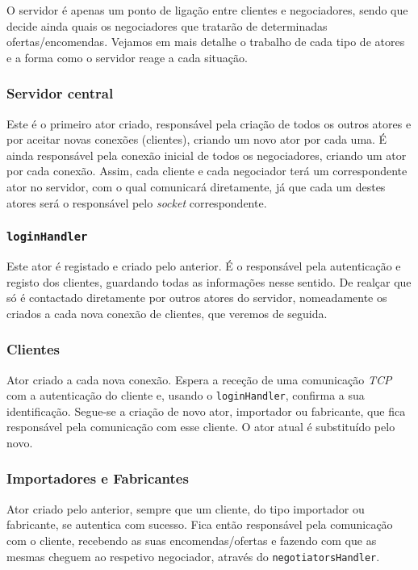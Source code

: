 \documentclass[a4paper]{report}
\begin{document}
	O servidor é apenas um ponto de ligação entre clientes e negociadores, sendo que decide ainda quais os negociadores que tratarão de determinadas ofertas/encomendas.
	Vejamos em mais detalhe o trabalho de cada tipo de atores e a forma como o servidor reage a cada situação.

	\subsubsection{Servidor central}
	Este é o primeiro ator criado, responsável pela criação de todos os outros atores e por aceitar novas conexões (clientes), criando um novo ator por cada uma. 
	É ainda responsável pela conexão inicial de todos os negociadores, criando um ator por cada conexão.
	Assim, cada cliente e cada negociador terá um correspondente ator no servidor, com o qual comunicará diretamente, já que cada um destes atores será o responsável pelo \textit{socket} correspondente.

	\subsubsection{\texttt{loginHandler}}
	Este ator é registado e criado pelo anterior. É o responsável pela autenticação e registo dos clientes, guardando todas as informações nesse sentido. 
	De realçar que só é contactado diretamente por outros atores do servidor, nomeadamente os criados a cada nova conexão de clientes, que veremos de seguida.

	\subsubsection{Clientes}
	Ator criado a cada nova conexão. Espera a receção de uma comunicação \textit{TCP} com a autenticação do cliente e, usando o \texttt{loginHandler}, confirma a sua identificação.
	Segue-se a criação de novo ator, importador ou fabricante, que fica responsável pela comunicação com esse cliente. O ator atual é substituído pelo novo.

	\subsubsection{Importadores e Fabricantes}
	Ator criado pelo anterior, sempre que um cliente, do tipo importador ou fabricante, se autentica com sucesso. 
	Fica então responsável pela comunicação com o cliente, recebendo as suas encomendas/ofertas e fazendo com que as mesmas cheguem ao respetivo negociador, através do \texttt{negotiatorsHandler}.
\end{document}
